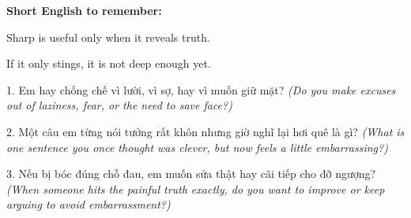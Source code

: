 \begin{ghinhoanh}
\textbf{Short English to remember:}

Sharp is useful only when it reveals truth.

If it only stings, it is not deep enough yet.
\end{ghinhoanh}

\begin{tuhocnhanh}
1. Em hay chống chế vì lười, vì sợ, hay vì muốn giữ mặt? \textit{(Do you make excuses out of laziness, fear, or the need to save face?)}

2. Một câu em từng nói tưởng rất khôn nhưng giờ nghĩ lại hơi quê là gì? \textit{(What is one sentence you once thought was clever, but now feels a little embarrassing?)}

3. Nếu bị bóc đúng chỗ đau, em muốn sửa thật hay cãi tiếp cho đỡ ngượng? \textit{(When someone hits the painful truth exactly, do you want to improve or keep arguing to avoid embarrassment?)}
\end{tuhocnhanh}

\ngancach